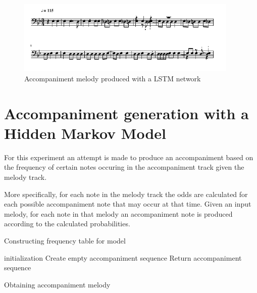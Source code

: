 \begin{figure}
\centerline{\includegraphics[width=400px]{../images/lstm_accomp.pdf}}
\caption{Accompaniment melody produced with a \ac{LSTM} network}
\label{ims:lstmaccomp}
\end{figure}

\chapter{Accompaniment generation with a Hidden Markov Model}
For this experiment an attempt is made to produce an accompaniment based on the frequency of certain notes occuring in the accompaniment track given the melody track.

More specifically, for each note in the melody track the odds are calculated for each possible accompaniment note that may occur at that time. Given an input melody, for each note in that melody an accompaniment note is produced according to the calculated probabilities.


\begin{algorithm}
 \caption{Constructing frequency table for model}
\end{algorithm}

\begin{algorithm}
 initialization\;
 Create empty accompaniment sequence\;
 Return accompaniment sequence\;
 \caption{Obtaining accompaniment melody}
\end{algorithm}


